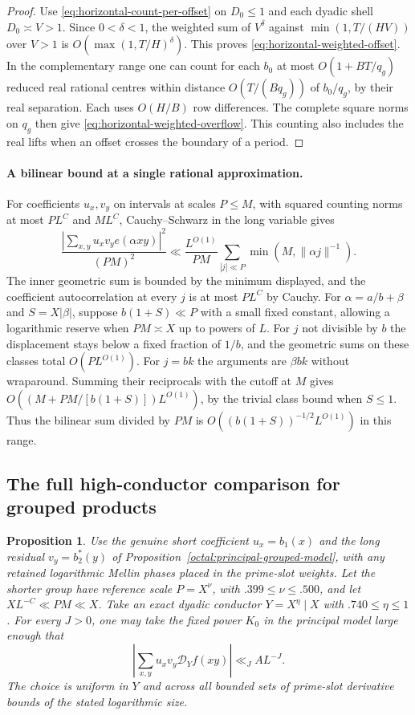 \documentclass[11pt,a4paper]{article}
\theoremstyle{paperplain}
\newtheorem{proposition}[theorem]{Proposition}
\numberwithin{equation}{section}
\begin{document}
\begin{proof}
Use \eqref{eq:horizontal-count-per-offset} on $D_0\le1$ and each
dyadic shell $D_0\asymp V>1$. Since $0<\delta<1$, the weighted
sum of $V^\delta$ against $\min(1,T/(HV))$ over $V>1$ is
$O(\max(1,T/H)^\delta)$. This proves
\eqref{eq:horizontal-weighted-offset}. In the complementary range
one can count for each $b_0$ at most $O(1+BT/q_g)$ reduced real
rational centres within distance $O(T/(Bq_g))$ of $b_0/q_g$, by
their real separation. Each uses $O(H/B)$ row differences. The
complete square norms on $q_g$ then give
\eqref{eq:horizontal-weighted-overflow}. This counting also includes
the real lifts when an offset crosses the boundary of a period.
\end{proof}


\paragraph{A bilinear bound at a single rational approximation.}
\label{sec:dynamic-rational-source-bands}
For coefficients $u_x,v_y$ on intervals at scales $P\le M$, with squared
counting norms at most $PL^C$ and $ML^C$, Cauchy--Schwarz in the long
variable gives
\[
 \frac{\left|\sum_{x,y}u_xv_y e(\alpha xy)\right|^2}{(PM)^2}
 \ll \frac{L^{O(1)}}{PM}\sum_{|j|\ll P}\min(M,\|\alpha j\|^{-1}).
\]
The inner geometric sum is bounded by the minimum displayed, and the
coefficient autocorrelation at every $j$ is at most $PL^C$ by Cauchy.
For $\alpha=a/b+\beta$ and $S=X|\beta|$, suppose $b(1+S)\ll P$ with a
small fixed constant, allowing a logarithmic reserve when $PM\asymp X$
up to powers of $L$. For $j$ not divisible by $b$ the displacement stays
below a fixed fraction of $1/b$, and the geometric sums on these classes
total $O(P L^{O(1)})$. For $j=bk$ the arguments are $\beta bk$ without
wraparound. Summing their reciprocals with the cutoff at $M$ gives
$O((M+PM/[b(1+S)])L^{O(1)})$, by the trivial class bound when $S\le1$.
Thus the bilinear sum divided by $PM$ is
$O((b(1+S))^{-1/2}L^{O(1)})$ in this range.


\subsection{The full high-conductor comparison for grouped products}
\label{sec:near-balanced-high-conductors}

\begin{proposition}\label{octal:near-balanced-high-conductors}
Use the genuine short coefficient $u_x=b_1(x)$ and the long residual $v_y=b_2^*(y)$
of Proposition~\ref{octal:principal-grouped-model}, with any retained
logarithmic Mellin phases placed in the prime-slot weights. Let the shorter
group have reference scale $P=X^\nu$, with $.399\le\nu\le.500$, and let
$XL^{-C}\ll PM\ll X$. Take an exact dyadic conductor $Y=X^\eta\mid X$ with
$.740\le\eta\le1$. For every $J>0$, one may take the fixed power $K_0$ in
the principal model large enough that
\[
             \left|\sum_{x,y}u_xv_y\mathcal D_Y f(xy)\right|
                          \ll_J AL^{-J}.
\]
The choice is uniform in $Y$ and across all bounded sets of prime-slot
derivative bounds of the stated logarithmic size.
\end{proposition}
\end{document}
